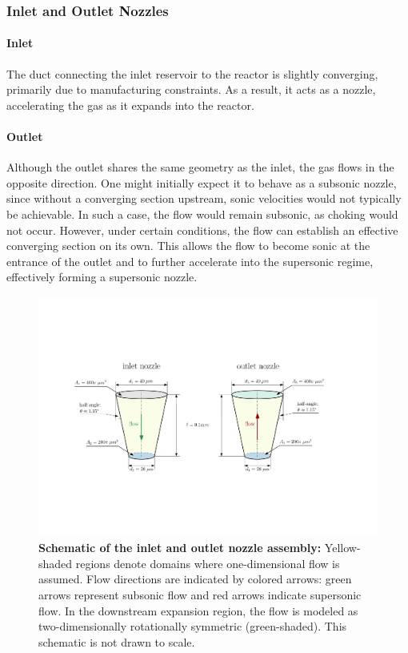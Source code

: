 \subsubsection*{Inlet and Outlet Nozzles}

	\paragraph{Inlet}
	The duct connecting the inlet reservoir to the reactor is slightly converging, primarily due to manufacturing constraints.
	As a result, it acts as a nozzle, accelerating the gas as it expands into the reactor.

	\paragraph{Outlet}
		Although the outlet shares the same geometry as the inlet, the gas flows in the opposite direction.
		One might initially expect it to behave as a subsonic nozzle, since without a converging section upstream, sonic velocities would not typically be achievable.
		In such a case, the flow would remain subsonic, as choking would not occur.
		However, under certain conditions, the flow can establish an effective converging section on its own.
		This allows the flow to become sonic at the entrance of the outlet and to further accelerate into the supersonic regime, effectively forming a supersonic nozzle.
		\cite{jousten_handbook_2016}
		\begin{figure}[H]
		    \centering
		    \includegraphics[width=\textwidth]{src/03_analytical-work/fig_nozzle-geometries.pdf}
		    \caption[Schematic of the inlet and outlet nozzle assembly.]{
		        \textbf{Schematic of the inlet and outlet nozzle assembly:}
		        Yellow-shaded regions denote domains where one-dimensional flow is assumed.
		        Flow directions are indicated by colored arrows: green arrows represent subsonic flow and red arrows indicate supersonic flow.
		        In the downstream expansion region, the flow is modeled as two-dimensionally rotationally symmetric (green-shaded).
		        This schematic is not drawn to scale.
		    }
		    \label{fig:geometry-nozzles}
		\end{figure}

